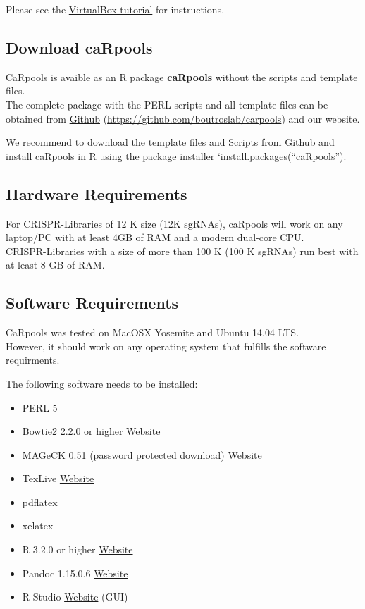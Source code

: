 \documentclass[]{article}
\providecommand{\tightlist}{%
  \setlength{\itemsep}{0pt}\setlength{\parskip}{0pt}}
\begin{document}
Please see the
\href{https://github.com/boutroslab/caRpools/blob/master/docs/CaRpools-SHORTGUIDE-VirtualBox.Rmd}{VirtualBox
tutorial} for instructions.

\subsection{Download caRpools}\label{download-carpools-1}

CaRpools is avaible as an R package \textbf{caRpools} without the
scripts and template files.\\
The complete package with the PERL scripts and all template files can be
obtained from \href{https://github.com/boutroslab/carpools}{Github}
(\url{https://github.com/boutroslab/carpools}) and our website.

We recommend to download the template files and Scripts from Github and
install caRpools in R using the package installer
`install.packages(``caRpools'').

\subsection{Hardware Requirements}\label{hardware-requirements}

For CRISPR-Libraries of 12 K size (12K sgRNAs), caRpools will work on
any laptop/PC with at least 4GB of RAM and a modern dual-core CPU.\\
CRISPR-Libraries with a size of more than 100 K (100 K sgRNAs) run best
with at least 8 GB of RAM.

\subsection{Software Requirements}\label{software-requirements}

CaRpools was tested on MacOSX Yosemite and Ubuntu 14.04 LTS.\\
However, it should work on any operating system that fulfills the
software requirments.

The following software needs to be installed:

\begin{itemize}
\tightlist
\item
  PERL 5
\item
  Bowtie2 2.2.0 or higher
  \href{http://bowtie-bio.sourceforge.net/bowtie2/index.shtml}{Website}
\item
  MAGeCK 0.51 (password protected download)
  \href{http://sourceforge.net/p/mageck/wiki/Home/}{Website}
\item
  TexLive \href{https://www.tug.org/texlive/}{Website}
\item
  pdflatex
\item
  xelatex
\item
  R 3.2.0 or higher \href{https://www.r-project.org/}{Website}
\item
  Pandoc 1.15.0.6 \href{http://www.http://pandoc.org/}{Website}
\item
  R-Studio \href{http://www.rstudio.com}{Website} (GUI)
\end{itemize}
\end{document}
